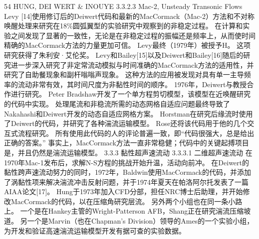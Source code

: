 \documentclass[UTF8,11pt,a4paper,openany,fontset=fandol]{ctexbook}
\begin{document}
54 HUNG, DEI WERT \& INOUYE 3.3.2.3 Mac-2, Unsteady Transonic Flows Levy [14]使用修订后的Deiwert代码和最新的MacCormack（Mac-2）方法和不对称唤醒处理来研究在18\%圆弧翼型的实验研究中观察到的非稳定过程。 在计算和实验之间发现了显著的一致性，无论是在非稳定过程的振幅还是频率上，从而使时间精确的MacCormack方法的力量更加可信。 Levy最终（1979年）被授予H。 这项研究获得了朱利安·艾伦奖。 Levy和Bailey[15]以及Deiwert和Bailey[16]随后的研究进一步深入研究了非定常流动模拟与时间准确的MacCormack方法的适用性，并研究了自助餐现象和副杆嗡嗡声现象。 这种方法的应用被发现对具有单一主导频率的流动非常有效，其时间尺度为非黏性时间的顺序。 1976年，Deiwert与教授合作进行研究。 Peter Bradshaw开发了一个单方程剪切模型，该模型在近唤醒研究的代码中实现。 处理尾流和非稳流所需的动态网格自适应问题最终导致了Nakahashi和Deiwert开发的动态自适应网格方案。 Horstman在研究后缘流时使用了Deiwert的代码，并研究了各种湍流运输模型。 Rose还将该代码用于他的几个交互式流程研究。 所有使用此代码的人的评论普遍一致，即“代码很强大，总是给出正确的答案。” 事实上，MacCormack方法一直非常稳健；代码中的关键起搏项目是，并且仍然是湍流运输模型。 3.3.3 黏性超声速流动 3.3.3.1 二维超声速流动 在1970年Mac-1发布后，求解N-S方程的挑战开始升温，活动向前冲。 在Deiwert的黏性跨声速流动努力的同时，1972年，Baldwin使用MacCormack的代码，并添加了涡黏性项来解决湍流冲击反射问题，并于1974年夏天在帕洛阿尔托发表了一篇AIAA论文[17]。 Hung于1973年加入CFD分部，担任NRC博士后助理，并开始修改MacCormack的代码，以在压缩角研究层流。 另外两个小组也在同一条小路上。 一个是在Hankey主管的Wright-Patterson AFB，Shang正在研究湍流压缩坡道。 另一个是Marvin（也在Chapman's Division）领导的Ames的一个实验小组，为开发和验证高速湍流运输模型开发有据可查的实验数据。
\end{document}
